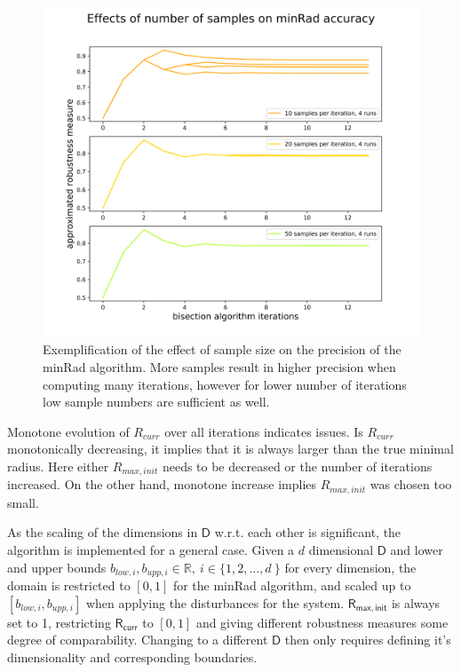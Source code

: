     \begin{figure}[ht] 
    \centering
    \includegraphics[width=.9\linewidth]{figures/minRad_tuning_graph.png}
    \caption[minRad Tuning]{Exemplification of the effect of sample size on the precision of the minRad algorithm. More samples result in higher precision when computing many iterations, however for lower number of iterations low sample numbers are sufficient as well.}
    \label{fig:minradcomp}
    \end{figure}

    Monotone evolution of $R_{curr}$ over all iterations indicates issues. Is $R_{curr}$ monotonically decreasing, it implies that it is always larger than the true minimal radius. Here either $R_{max,init}$ needs to be decreased or the number of iterations increased. On the other hand, monotone increase implies $R_{max,init}$ was chosen too small.

    As the scaling of the dimensions in $\mathsf{D}$ w.r.t. each other is significant, the algorithm is implemented for a general case. Given a $d$ dimensional $\mathsf{D}$ and lower and upper bounds $b_{low,i}, b_{upp,i} \in \mathbb{R},\ i \in \{1,2,\ldots,d\ \}$ for every dimension, the domain is restricted to $[0,1]$ for the minRad algorithm, and scaled up to $[b_{low,i}, b_{upp,i}]$ when applying the disturbances for the system. $\mathsf{R_{max,init}}$ is always set to 1, restricting $\mathsf{R_{curr}}$ to $[0,1]$ and giving different robustness measures some degree of comparability. 
    Changing to a different $\mathsf{D}$ then only requires defining it's dimensionality and corresponding boundaries.

